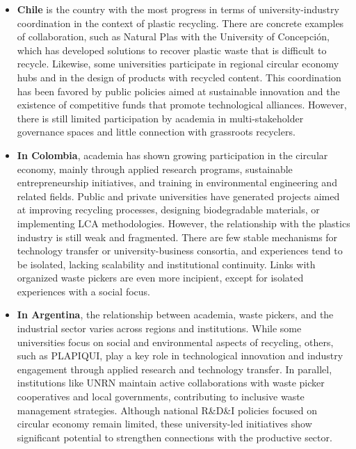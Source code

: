 \documentclass[
  12pt,
  oneside]{book}
\begin{document}
\begin{itemize}
\item
  \textbf{Chile} is the country with the most progress in terms of
  university-industry coordination in the context of plastic recycling.
  There are concrete examples of collaboration, such as Natural Plas
  with the University of Concepción, which has developed solutions to
  recover plastic waste that is difficult to recycle. Likewise, some
  universities participate in regional circular economy hubs and in the
  design of products with recycled content. This coordination has been
  favored by public policies aimed at sustainable innovation and the
  existence of competitive funds that promote technological alliances.
  However, there is still limited participation by academia in
  multi-stakeholder governance spaces and little connection with
  grassroots recyclers.
\item
  \textbf{In Colombia}, academia has shown growing participation in the
  circular economy, mainly through applied research programs,
  sustainable entrepreneurship initiatives, and training in
  environmental engineering and related fields. Public and private
  universities have generated projects aimed at improving recycling
  processes, designing biodegradable materials, or implementing LCA
  methodologies. However, the relationship with the plastics industry is
  still weak and fragmented. There are few stable mechanisms for
  technology transfer or university-business consortia, and experiences
  tend to be isolated, lacking scalability and institutional continuity.
  Links with organized waste pickers are even more incipient, except for
  isolated experiences with a social focus.
\item
  \textbf{In Argentina}, the relationship between academia, waste
  pickers, and the industrial sector varies across regions and
  institutions. While some universities focus on social and
  environmental aspects of recycling, others, such as PLAPIQUI, play a
  key role in technological innovation and industry engagement through
  applied research and technology transfer. In parallel, institutions
  like UNRN maintain active collaborations with waste picker
  cooperatives and local governments, contributing to inclusive waste
  management strategies. Although national R\&D\&I policies focused on
  circular economy remain limited, these university-led initiatives show
  significant potential to strengthen connections with the productive
  sector.
\end{itemize}
\end{document}
